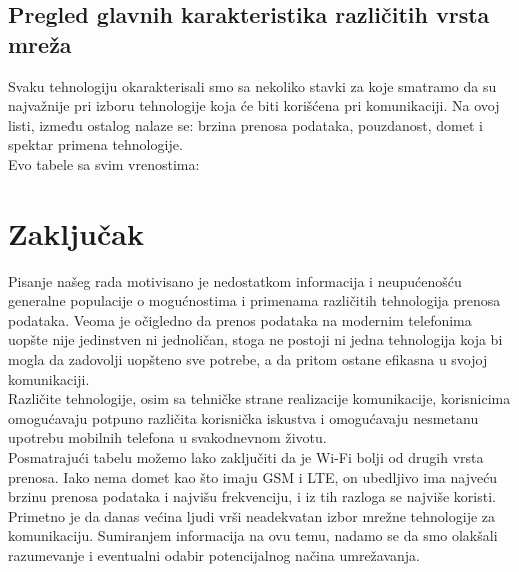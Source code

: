 \documentclass[a4paper]{article}
\begin{document}
\subsection{Pregled glavnih karakteristika različitih vrsta mreža}
Svaku tehnologiju okarakterisali smo sa nekoliko stavki za koje smatramo da su najvažnije pri izboru tehnologije koja će biti korišćena pri komunikaciji. Na ovoj listi, između ostalog nalaze se: brzina prenosa podataka, pouzdanost, domet i spektar primena tehnologije.\\
Evo tabele sa svim vrenostima:\\
\begin{center}
  \end{center}

\section{Zaključak}
Pisanje našeg rada motivisano je nedostatkom informacija i neupućenošću generalne populacije o mogućnostima i primenama različitih tehnologija prenosa podataka. Veoma je očigledno da prenos podataka na modernim telefonima uopšte nije jedinstven ni jednoličan, stoga ne postoji ni jedna tehnologija koja bi mogla da zadovolji uopšteno sve potrebe, a da pritom ostane efikasna u svojoj komunikaciji.\\
Različite tehnologije, osim sa tehničke strane realizacije komunikacije, korisnicima omogućavaju potpuno različita korisnička iskustva i omogućavaju nesmetanu upotrebu mobilnih telefona u svakodnevnom životu.\\
Posmatrajući tabelu možemo lako zaključiti da je Wi-Fi bolji od drugih vrsta prenosa. Iako nema domet kao što imaju GSM i LTE, on ubedljivo ima najveću brzinu prenosa podataka i najvišu frekvenciju, i iz tih razloga se najviše koristi.
Primetno je da danas većina ljudi vrši neadekvatan izbor mrežne tehnologije za komunikaciju. Sumiranjem informacija na ovu temu, nadamo se da smo olakšali razumevanje i eventualni odabir potencijalnog načina umrežavanja. 
\end{document}
